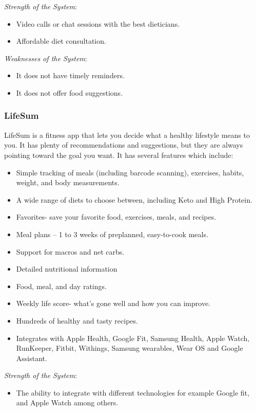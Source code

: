 \documentclass{article}
\begin{document}
\textit{Strength of the System}:
\begin{itemize}
    \item Video calls or chat sessions with the best dieticians.
    \item Affordable diet consultation.
\end{itemize}

\textit{Weaknesses of the System}:
\begin{itemize}
    \item It does not have timely reminders.
    \item It does not offer food suggestions.
\end{itemize}

\subsubsection{LifeSum}
LifeSum is a fitness app that lets you decide what a healthy lifestyle means to you. It has plenty of recommendations and suggestions, but they are always pointing toward the goal you want. It has several features which include:

\begin{itemize}
    \item Simple tracking of meals (including barcode scanning), exercises, habits, weight, and body measurements.
    \item A wide range of diets to choose between, including Keto and High Protein.
    \item Favorites- save your favorite food, exercises, meals, and recipes.
    \item Meal plans – 1 to 3 weeks of preplanned, easy-to-cook meals.
    \item Support for macros and net carbs.
    \item Detailed nutritional information
    \item Food, meal, and day ratings.
    \item Weekly life score- what’s gone well and how you can improve.
    \item Hundreds of healthy and tasty recipes.
    \item Integrates with Apple Health, Google Fit, Samsung Health, Apple Watch, RunKeeper, Fitbit, Withings, Samsung wearables, Wear OS and Google Assistant.
\end{itemize}

\textit{Strength of the System}:
\begin{itemize}
    \item The ability to integrate with different technologies for example Google fit, and Apple Watch among others.
\end{itemize}
\end{document}

